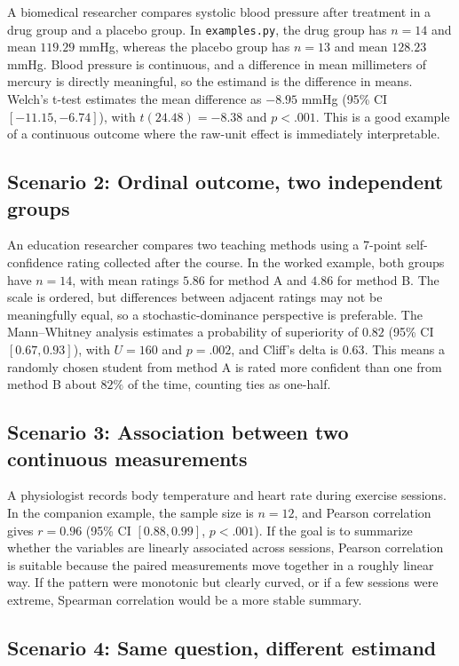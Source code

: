 \documentclass[11pt]{article}
\begin{document}
A biomedical researcher compares systolic blood pressure after treatment in a drug group and a placebo group. In \verb|examples.py|, the drug group has $n = 14$ and mean $119.29$ mmHg, whereas the placebo group has $n = 13$ and mean $128.23$ mmHg. Blood pressure is continuous, and a difference in mean millimeters of mercury is directly meaningful, so the estimand is the difference in means. Welch's t-test estimates the mean difference as $-8.95$ mmHg (95\% CI $[-11.15, -6.74]$), with $t(24.48) = -8.38$ and $p < .001$. This is a good example of a continuous outcome where the raw-unit effect is immediately interpretable.

\subsection{Scenario 2: Ordinal outcome, two independent groups}

An education researcher compares two teaching methods using a 7-point self-confidence rating collected after the course. In the worked example, both groups have $n = 14$, with mean ratings $5.86$ for method A and $4.86$ for method B. The scale is ordered, but differences between adjacent ratings may not be meaningfully equal, so a stochastic-dominance perspective is preferable. The Mann--Whitney analysis estimates a probability of superiority of $0.82$ (95\% CI $[0.67, 0.93]$), with $U = 160$ and $p = .002$, and Cliff's delta is $0.63$. This means a randomly chosen student from method A is rated more confident than one from method B about $82\%$ of the time, counting ties as one-half.

\subsection{Scenario 3: Association between two continuous measurements}

A physiologist records body temperature and heart rate during exercise sessions. In the companion example, the sample size is $n = 12$, and Pearson correlation gives $r = 0.96$ (95\% CI $[0.88, 0.99]$, $p < .001$). If the goal is to summarize whether the variables are linearly associated across sessions, Pearson correlation is suitable because the paired measurements move together in a roughly linear way. If the pattern were monotonic but clearly curved, or if a few sessions were extreme, Spearman correlation would be a more stable summary.

\subsection{Scenario 4: Same question, different estimand}
\end{document}
